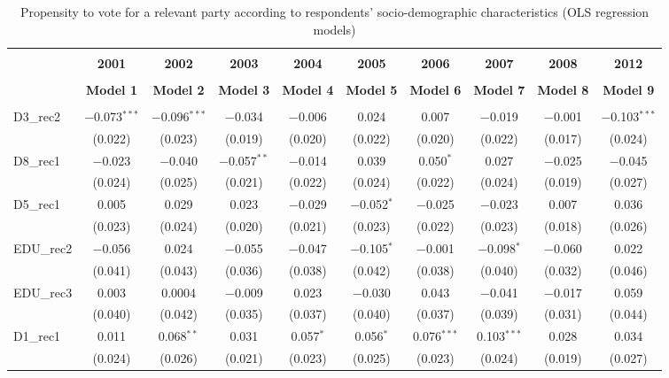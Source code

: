 \documentclass[
]{article}
\begin{document}
\begin{table}[!htbp] \centering 
  \caption{Propensity to vote for a relevant party according to respondents' 
                     socio-demographic characteristics (OLS regression models)} 
  \label{table:full_ols_nl} 
\begin{tabular}{@{\extracolsep{5pt}}lccccccccc} 
\\[-1.8ex]\hline \\[-1.8ex] 
 & \textbf{2001} & \textbf{2002} & \textbf{2003} & \textbf{2004} & \textbf{2005} & \textbf{2006} & \textbf{2007} & \textbf{2008} & \textbf{2012} \\ 
\\[-1.8ex] & \textbf{Model 1} & \textbf{Model 2} & \textbf{Model 3} & \textbf{Model 4} & \textbf{Model 5} & \textbf{Model 6} & \textbf{Model 7} & \textbf{Model 8} & \textbf{Model 9}\\ 
\hline \\[-1.8ex] 
 D3\_rec2 & $-$0.073$^{***}$ & $-$0.096$^{***}$ & $-$0.034 & $-$0.006 & 0.024 & 0.007 & $-$0.019 & $-$0.001 & $-$0.103$^{***}$ \\ 
  & (0.022) & (0.023) & (0.019) & (0.020) & (0.022) & (0.020) & (0.022) & (0.017) & (0.024) \\ 
  D8\_rec1 & $-$0.023 & $-$0.040 & $-$0.057$^{**}$ & $-$0.014 & 0.039 & 0.050$^{*}$ & 0.027 & $-$0.025 & $-$0.045 \\ 
  & (0.024) & (0.025) & (0.021) & (0.022) & (0.024) & (0.022) & (0.024) & (0.019) & (0.027) \\ 
  D5\_rec1 & 0.005 & 0.029 & 0.023 & $-$0.029 & $-$0.052$^{*}$ & $-$0.025 & $-$0.023 & 0.007 & 0.036 \\ 
  & (0.023) & (0.024) & (0.020) & (0.021) & (0.023) & (0.022) & (0.023) & (0.018) & (0.026) \\ 
  EDU\_rec2 & $-$0.056 & 0.024 & $-$0.055 & $-$0.047 & $-$0.105$^{*}$ & $-$0.001 & $-$0.098$^{*}$ & $-$0.060 & 0.022 \\ 
  & (0.041) & (0.043) & (0.036) & (0.038) & (0.042) & (0.038) & (0.040) & (0.032) & (0.046) \\ 
  EDU\_rec3 & 0.003 & 0.0004 & $-$0.009 & 0.023 & $-$0.030 & 0.043 & $-$0.041 & $-$0.017 & 0.059 \\ 
  & (0.040) & (0.042) & (0.035) & (0.037) & (0.040) & (0.037) & (0.039) & (0.031) & (0.044) \\ 
  D1\_rec1 & 0.011 & 0.068$^{**}$ & 0.031 & 0.057$^{*}$ & 0.056$^{*}$ & 0.076$^{***}$ & 0.103$^{***}$ & 0.028 & 0.034 \\ 
  & (0.024) & (0.026) & (0.021) & (0.023) & (0.025) & (0.023) & (0.024) & (0.019) & (0.027) \\ 

\end{tabular}
\end{table}
\end{document}
